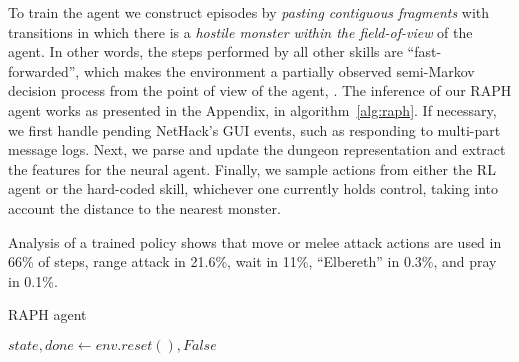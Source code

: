 To train the agent we construct episodes by \emph{pasting contiguous fragments} with transitions in which there is a \emph{hostile monster within the field-of-view} of the agent. In other words, the steps performed by all other skills are ``fast-forwarded'', which makes the environment a partially observed semi-Markov decision process from the point of view of the agent, \cite{Sutton1999}.
%
The inference of our RAPH agent works as presented in the Appendix, in algorithm~\ref{alg:raph}. If necessary, we first handle pending NetHack's GUI events, such as responding to multi-part message logs. Next, we parse and update the dungeon representation and extract the features for the neural agent. Finally, we sample actions from either the RL agent or the hard-coded skill, whichever one currently holds control, taking into account the distance to the nearest monster.


Analysis of a trained policy shows that move or melee attack actions are used in 66\% of steps, range attack in 21.6\%, wait in 11\%, ``Elbereth'' in 0.3\%, and pray in 0.1\%. 




\begin{algorithm}[H]
\caption{RAPH agent}\label{alg:raph}
$state, done \gets env.reset(), False$\;

\end{algorithm}
\clearpage
